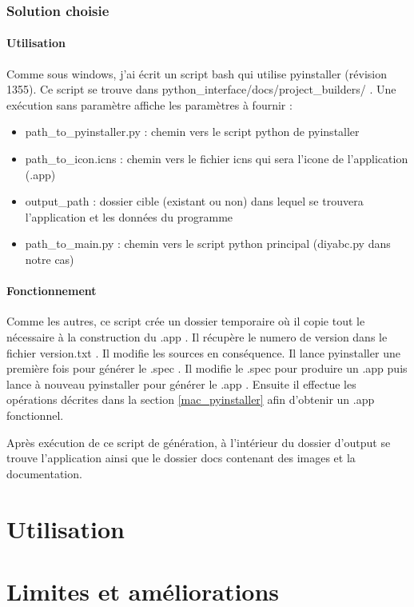 \documentclass[12pt,a4paper]{article}
\begin{document}
        \subsubsection{Solution choisie}
        \paragraph{Utilisation}

        Comme sous windows, j'ai écrit un script bash qui utilise pyinstaller (révision 1355). Ce script se trouve dans python\_interface/docs/project\_builders/ .
        Une exécution sans paramètre affiche les paramètres à fournir : \\

        \begin{itemize}
            \item path\_to\_pyinstaller.py : chemin vers le script python de pyinstaller
            \item path\_to\_icon.icns : chemin vers le fichier icns qui sera l'icone de l'application (.app)
            \item output\_path : dossier cible (existant ou non) dans lequel se trouvera l'application et les données du programme
            \item path\_to\_main.py : chemin vers le script python principal (diyabc.py dans notre cas)\\
        \end{itemize}

        \paragraph{Fonctionnement}

        Comme les autres, ce script crée un dossier temporaire où il copie tout le nécessaire à la construction du .app .
        Il récupère le numero de version dans le fichier version.txt . Il modifie les sources en conséquence. Il lance pyinstaller
        une première fois pour générer le .spec . Il modifie le .spec pour produire un .app puis lance à nouveau pyinstaller pour générer le .app .
        Ensuite il effectue les opérations décrites 
        dans la section \ref{mac_pyinstaller} afin d'obtenir un .app fonctionnel.

        Après exécution de ce script de génération, à l'intérieur du dossier d'output se trouve l'application ainsi que le dossier
        docs contenant des images et la documentation.


\section{Utilisation}

\section{Limites et améliorations}
\end{document}
